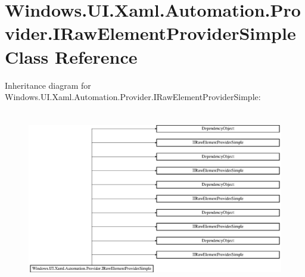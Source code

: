 \hypertarget{class_windows_1_1_u_i_1_1_xaml_1_1_automation_1_1_provider_1_1_i_raw_element_provider_simple}{}\section{Windows.\+U\+I.\+Xaml.\+Automation.\+Provider.\+I\+Raw\+Element\+Provider\+Simple Class Reference}
\label{class_windows_1_1_u_i_1_1_xaml_1_1_automation_1_1_provider_1_1_i_raw_element_provider_simple}
Inheritance diagram for Windows.\+U\+I.\+Xaml.\+Automation.\+Provider.\+I\+Raw\+Element\+Provider\+Simple\+:\begin{figure}[H]
\begin{center}
\leavevmode
\includegraphics[height=7.758186cm]{class_windows_1_1_u_i_1_1_xaml_1_1_automation_1_1_provider_1_1_i_raw_element_provider_simple}
\end{center}
\end{figure}
